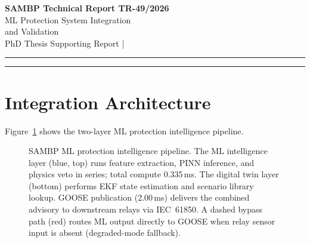 \documentclass[11pt,a4paper]{article}
\begin{document}
\begin{center}
  {\LARGE\bfseries\color{sambpblue} SAMBP Technical Report TR-49/2026}\\[6pt]
  {\large ML Protection System Integration\\
    and Validation}\\[10pt]
  {\normalsize PhD Thesis Supporting Report \quad|}
\end{center}

\vspace{2pt}\hrule\vspace{8pt}

\begin{abstract}
\noindent
This report integrates the PINN classifier (TR-46), physics-constrained feature
engineering (TR-47), and online learning framework (TR-48) into the unified
SAMBP ML protection intelligence layer.  The architecture places the relay-physics
engine as the primary trip authority and the PINN as a physics-vetted advisory
layer, with the ML fallback activated only under relay sensor degradation.
Study A quantifies the end-to-end pipeline latency at 2.335\,ms (4.7\% of the
50\,ms relay trip budget), dominated by GOOSE publication at 2.00\,ms (85.7\%).
Study B validates the integration architecture on $N=500$ scenarios: the relay
achieves 100\% accuracy; the PINN under realistic sensor noise achieves 66.8\%
standalone.  Study C confirms that the physics veto prevents 3/500 physics
violations (0.6\%) in ML-advisory mode, achieving 0\% physics violation rate
in the combined output.  Study D shows that the ML fallback achieves
85.4--77.8\% accuracy across five sensor degradation scenarios, establishing
a serviceable floor when relay sensor inputs are unavailable.
\end{abstract}

\vspace{4pt}\hrule\vspace{10pt}

\section{Integration Architecture}
\label{sec:arch}

Figure~\ref{fig:pipeline} shows the two-layer ML protection intelligence
pipeline.

\begin{figure}[htbp]
  \centering
  \resizebox{0.96\textwidth}{!}{}
  \caption{SAMBP ML protection intelligence pipeline.  The ML intelligence
           layer (blue, top) runs feature extraction, PINN inference, and
           physics veto in series; total compute 0.335\,ms.  The digital twin
           layer (bottom) performs EKF state estimation and scenario library
           lookup.  GOOSE publication (2.00\,ms) delivers the combined
           advisory to downstream relays via IEC~61850.  A dashed bypass path
           (red) routes ML output directly to GOOSE when relay sensor input is
           absent (degraded-mode fallback).}
  \label{fig:pipeline}
\end{figure}
\end{document}
